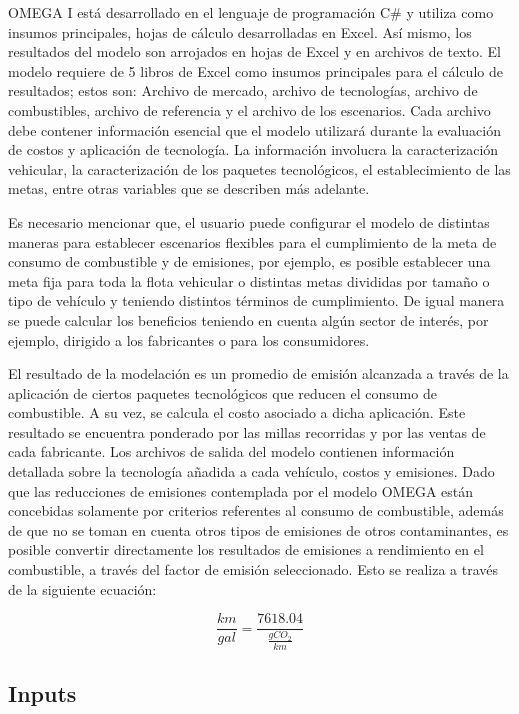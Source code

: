 OMEGA I está desarrollado en el lenguaje de programación C\# y utiliza como insumos principales, hojas de cálculo desarrolladas en Excel. Así mismo, los resultados del modelo son arrojados en hojas de Excel y en archivos de texto. El modelo requiere de 5 libros de Excel como insumos principales para el cálculo de resultados; estos son: Archivo de mercado, archivo de tecnologías, archivo de combustibles, archivo de referencia y el archivo de los escenarios. Cada archivo debe contener información esencial que el modelo utilizará durante la evaluación de costos y aplicación de tecnología. La información involucra la caracterización vehicular, la caracterización de los paquetes tecnológicos, el establecimiento de las metas, entre otras variables que se describen más adelante.  \label{Actualizar Información} \label{Informe Final}

Es necesario mencionar que, el usuario puede configurar el modelo de distintas maneras para establecer escenarios flexibles para el cumplimiento de la meta de consumo de combustible y de emisiones, por ejemplo, es posible establecer una meta fija para toda la flota vehicular o distintas metas divididas por tamaño o tipo de vehículo y teniendo distintos términos de cumplimiento. De igual manera se puede calcular los beneficios teniendo en cuenta algún sector de interés, por ejemplo, dirigido a los fabricantes o para los consumidores.  

El resultado de la modelación es un promedio de emisión alcanzada a través de la aplicación de ciertos paquetes tecnológicos que reducen el consumo de combustible. A su vez, se calcula el costo asociado a dicha aplicación. Este resultado se encuentra ponderado por las millas recorridas y por las ventas de cada fabricante. Los archivos de salida del modelo contienen información detallada sobre la tecnología añadida a cada vehículo, costos y emisiones. Dado que las reducciones de emisiones contemplada por el modelo OMEGA están concebidas solamente por criterios referentes al consumo de combustible, además de que no se toman en cuenta otros tipos de emisiones de otros contaminantes, es posible convertir directamente los resultados de emisiones a rendimiento en el combustible, a través del factor de emisión seleccionado. Esto se realiza a través de la siguiente ecuación: 

$$ \frac{km}{gal} = \frac{7618.04}{\frac{gCO_2}{km}}$$

\subsection{Inputs}

